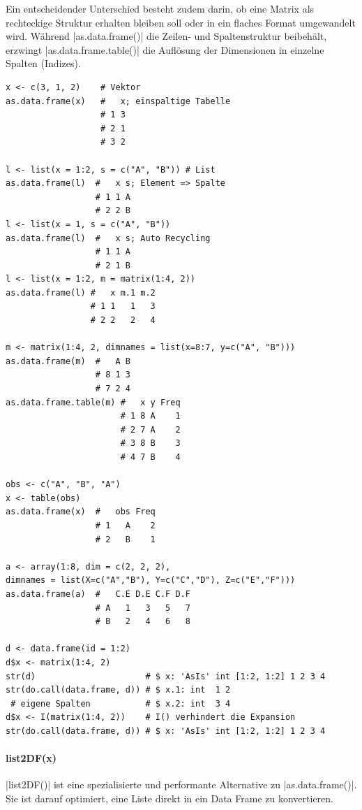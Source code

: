 \documentclass[10pt,twocolumn]{scrartcl}
\renewcommand{\lstinline}{\mycoloredinline}
\begin{document}
Ein entscheidender Unterschied besteht zudem darin, ob eine Matrix als rechteckige Struktur erhalten bleiben soll oder in ein flaches Format umgewandelt wird. Während \lstinline|as.data.frame()| die Zeilen- und Spaltenstruktur beibehält, erzwingt \lstinline|as.data.frame.table()| die Auflösung der Dimensionen in einzelne Spalten (Indizes).

\begin{lstlisting}
x <- c(3, 1, 2)    # Vektor
as.data.frame(x)   #   x; einspaltige Tabelle
                   # 1 3
                   # 2 1
                   # 3 2

l <- list(x = 1:2, s = c("A", "B")) # List
as.data.frame(l)  #   x s; Element => Spalte
                  # 1 1 A
                  # 2 2 B
l <- list(x = 1, s = c("A", "B"))
as.data.frame(l)  #   x s; Auto Recycling
                  # 1 1 A
                  # 2 1 B
l <- list(x = 1:2, m = matrix(1:4, 2))
as.data.frame(l) #   x m.1 m.2
                 # 1 1   1   3
                 # 2 2   2   4

m <- matrix(1:4, 2, dimnames = list(x=8:7, y=c("A", "B")))
as.data.frame(m)  #   A B
                  # 8 1 3
                  # 7 2 4
as.data.frame.table(m) #   x y Freq
                       # 1 8 A    1
                       # 2 7 A    2
                       # 3 8 B    3
                       # 4 7 B    4

obs <- c("A", "B", "A")
x <- table(obs)
as.data.frame(x)  #   obs Freq
                  # 1   A    2
                  # 2   B    1

a <- array(1:8, dim = c(2, 2, 2),
dimnames = list(X=c("A","B"), Y=c("C","D"), Z=c("E","F")))
as.data.frame(a)  #   C.E D.E C.F D.F
                  # A   1   3   5   7
                  # B   2   4   6   8

d <- data.frame(id = 1:2)
d$x <- matrix(1:4, 2)
str(d)                      # $ x: 'AsIs' int [1:2, 1:2] 1 2 3 4
str(do.call(data.frame, d)) # $ x.1: int  1 2
 # eigene Spalten           # $ x.2: int  3 4
d$x <- I(matrix(1:4, 2))    # I() verhindert die Expansion
str(do.call(data.frame, d)) # $ x: 'AsIs' int [1:2, 1:2] 1 2 3 4
\end{lstlisting}


\paragraph{list2DF(x)}

\lstinline|list2DF()| ist eine spezialisierte und performante Alternative zu \lstinline|as.data.frame()|. Sie ist darauf optimiert, eine Liste direkt in ein Data Frame zu konvertieren.
\end{document}
